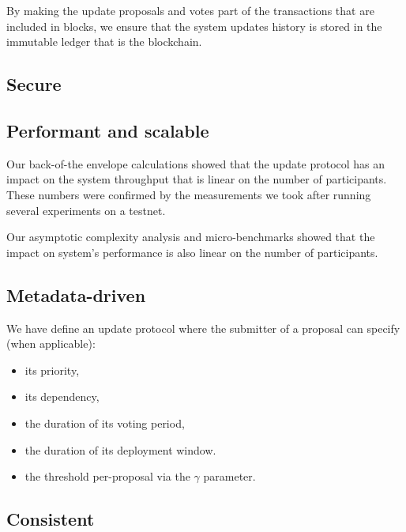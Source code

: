 \documentclass[11pt,a4paper]{article}
\begin{document}
By making the update proposals and votes part of the transactions that are
included in blocks, we ensure that the system updates history is stored in the
immutable ledger that is the blockchain.

\subsection{Secure}
\label{sec:sat-secure}

%
%
%

\subsection{Performant and scalable}
\label{sec:sat-performant-scalable}

Our back-of-the envelope calculations showed that the update protocol has an
impact on the system throughput that is linear on the number of participants.
These numbers were confirmed by the measurements we took after running several
experiments on a testnet.

Our asymptotic complexity analysis and micro-benchmarks showed that the impact
on system's performance is also linear on the number of participants.

\subsection{Metadata-driven}
\label{sec:sat-metadata-driven}

We have define an update protocol where the submitter of a proposal can specify
(when applicable):
\begin{itemize}
\item its priority,
\item its dependency,
\item the duration of its voting period,
\item the duration of its deployment window.
\item the threshold per-proposal via the $\gamma$ parameter.
\end{itemize}

\subsection{Consistent}
\label{sec:sat-cons-update-logic}
\end{document}
